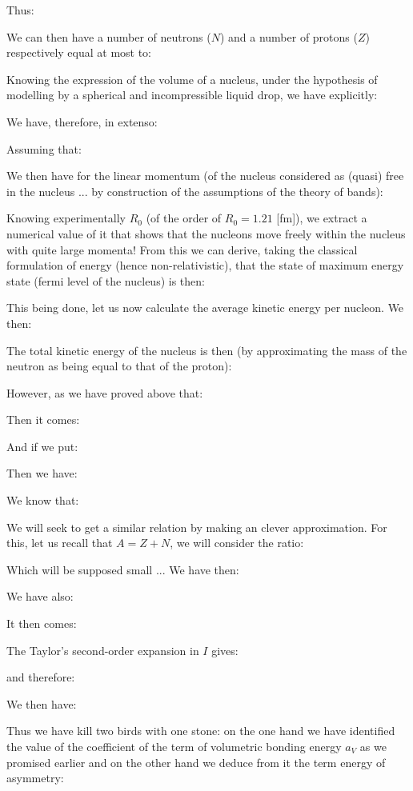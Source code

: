 	Thus:
	
	We can then have a number of neutrons ($N$) and a number of protons ($Z$) respectively equal at most to:
	
	Knowing the expression of the volume of a nucleus, under the hypothesis of modelling by a spherical and incompressible liquid drop, we have explicitly:
	
	We have, therefore, in extenso:
	
	Assuming that:
	
	We then have for the linear momentum (of the nucleus considered as (quasi) free in the nucleus ... by construction of the assumptions of the theory of bands):
	
	Knowing experimentally $R_0$ (of the order of $R_0=1.21$ [fm]), we extract a numerical value of it that shows that the nucleons move freely within the nucleus with quite large momenta! From this we can derive, taking the classical formulation of energy (hence non-relativistic), that the state of maximum energy state (fermi level of the nucleus) is then:
	
	This being done, let us now calculate the average kinetic energy per nucleon. We then:
	
	The total kinetic energy of the nucleus is then (by approximating the mass of the neutron as being equal to that of the proton):
	
	However, as we have proved above that:
	
	Then it comes:
	
	And if we put:
	
	Then we have:
	
	We know that:
	
	We will seek to get a similar relation by making an clever approximation. For this, let us recall that $A = Z + N$, we will consider the ratio:
	
	Which will be supposed small ... We have then:
	
	We have also:
	
	It then comes:
	
	The Taylor's second-order expansion in $I$ gives:
	
	and therefore:
	
	We then have:
	
	Thus we have kill two birds with one stone: on the one hand we have identified the value of the coefficient of the term of volumetric bonding energy $a_V$ as we promised earlier and on the other hand we deduce from it the term energy of asymmetry:
	
